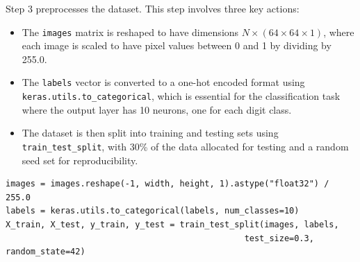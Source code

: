 \begin{step}
Step 3 preprocesses the dataset. This step involves three key actions:
\begin{itemize}[b]
    \item The \texttt{images} matrix is reshaped to have dimensions $N \times (64 \times 64 \times 1)$, where each image is scaled to have pixel values between 0 and 1 by dividing by 255.0.
    \item The \texttt{labels} vector is converted to a one-hot encoded format using \texttt{keras.utils.to\_categorical}, which is essential for the classification task where the output layer has 10 neurons, one for each digit class.
    \item The dataset is then split into training and testing sets using \texttt{train\_test\_split}, with 30\% of the data allocated for testing and a random seed set for reproducibility.
\end{itemize}

\begin{lstlisting}
images = images.reshape(-1, width, height, 1).astype("float32") / 255.0
labels = keras.utils.to_categorical(labels, num_classes=10)
X_train, X_test, y_train, y_test = train_test_split(images, labels, 
                                                test_size=0.3, random_state=42)
\end{lstlisting}  
\end{step}

